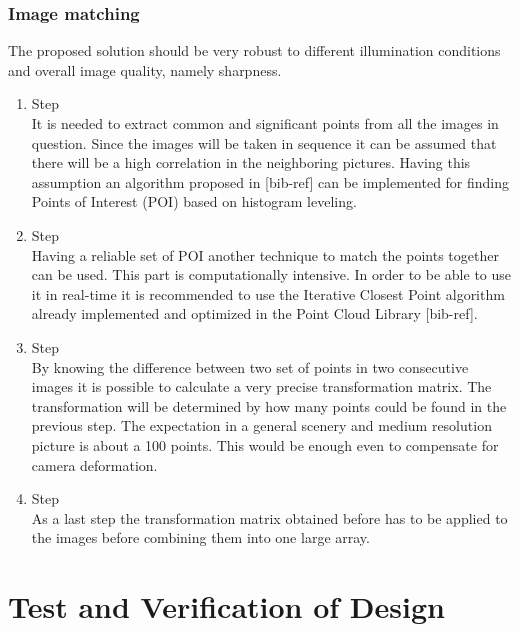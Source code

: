 \documentclass[fontsize=11pt,paper=a4,]{scrartcl}
\begin{document}
\subsubsection*{Image matching}
\label{sec:algorithm}
The proposed solution should be very robust to different illumination conditions and overall image quality, namely sharpness. 
\begin{enumerate}
\item Step\\
It is needed to extract common and significant points from all the images in question. Since the images
will be taken in sequence it can be assumed that there will be a high correlation in the neighboring pictures.
Having this assumption an algorithm proposed in {\color{red} [bib-ref]} can be implemented for finding 
Points of Interest (POI) based on histogram leveling. 
\item Step \\
Having a reliable set of POI another technique to match the points together can be used. This part is
computationally intensive. In order to be able to use it in real-time it is recommended to use the Iterative Closest Point
algorithm already implemented and optimized in the Point Cloud Library{\color{red} [bib-ref]}.
\item Step\\
By knowing the difference between two set of points in two consecutive images it is possible to calculate
a very precise transformation matrix. The transformation will be determined by how many points
could be found in the previous step. The expectation in a general scenery and medium resolution picture
is about a 100 points. This would be enough even to compensate for camera deformation.
\item Step \\
As a last step the transformation matrix obtained before has to be applied to the images before combining them into one large array. 
\end{enumerate}


\FloatBarrier
\section{Test and Verification of Design}
\end{document}
